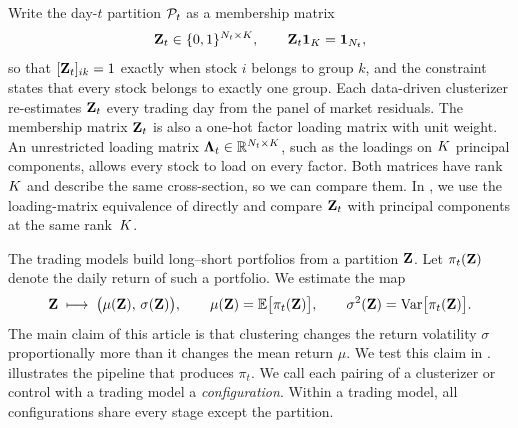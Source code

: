 Write the day-$t$ partition $\mathcal{P}_t$ as a membership matrix
%
\begin{equation}\label{eq:membership}
  \mathbf{Z}_t \in \{0,1\}^{N_t \times K},
  \qquad
  \mathbf{Z}_t \bm{1}_{K} = \bm{1}_{N_t},
\end{equation}
%
so that $[\mathbf{Z}_t]_{ik} = 1$ exactly when stock $i$ belongs to group $k$,
and the constraint states that every stock belongs to exactly one group. Each data-driven clusterizer re-estimates $\mathbf{Z}_t$ every trading day from the panel of market
residuals. The membership matrix $\mathbf{Z}_t$ is also a one-hot factor loading matrix with unit weight. An unrestricted loading matrix $\bm{\Lambda}_t \in \mathbb{R}^{N_t \times K}$, such as the loadings on $K$ principal components, allows every stock to load on every factor. Both matrices have rank $K$ and describe the same cross-section, so we can compare them. In , we use
the loading-matrix equivalence of  directly and
compare $\mathbf{Z}_t$ with principal components at the same rank~$K$.

The trading models build long--short portfolios from a partition $\mathbf{Z}$. Let $\pi_t(\mathbf{Z})$ denote the daily return of such a portfolio. We estimate the map
%
\begin{equation}\label{eq:estimand}
  \mathbf{Z} \;\longmapsto\; \bigl(\mu(\mathbf{Z}),\, \sigma(\mathbf{Z})\bigr),
  \qquad
  \mu(\mathbf{Z}) = \mathbb{E}\bigl[\pi_t(\mathbf{Z})\bigr],
  \qquad
  \sigma^2(\mathbf{Z}) = \mathrm{Var}\bigl[\pi_t(\mathbf{Z})\bigr]. \end{equation}
%
The main claim of this article is that clustering changes the return volatility $\sigma$ proportionally more than it changes the mean return $\mu$. We test this claim in .  illustrates the pipeline that produces $\pi_t$. We call each pairing of a clusterizer or control with a trading model a \emph{configuration}. Within a trading model, all configurations share every stage except the partition.

